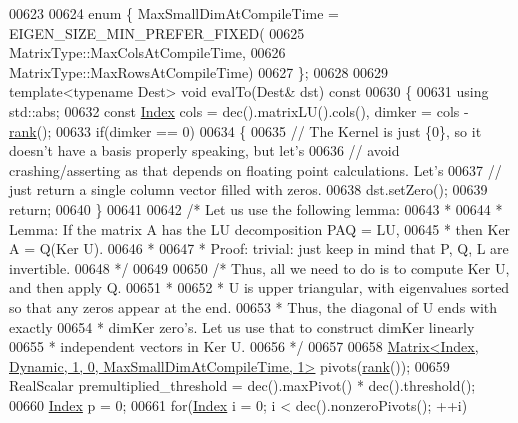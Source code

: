 \begin{DoxyCode}
00623 
00624   \textcolor{keyword}{enum} \{ MaxSmallDimAtCompileTime = EIGEN\_SIZE\_MIN\_PREFER\_FIXED(
00625             MatrixType::MaxColsAtCompileTime,
00626             MatrixType::MaxRowsAtCompileTime)
00627   \};
00628 
00629   \textcolor{keyword}{template}<\textcolor{keyword}{typename} Dest> \textcolor{keywordtype}{void} evalTo(Dest& dst)\textcolor{keyword}{ const}
00630 \textcolor{keyword}{  }\{
00631     \textcolor{keyword}{using} std::abs;
00632     \textcolor{keyword}{const} \hyperlink{namespace_eigen_a62e77e0933482dafde8fe197d9a2cfde}{Index} cols = dec().matrixLU().cols(), dimker = cols - \hyperlink{group___l_u___module_a67a870aa69e699e058d04802ba0bdad9}{rank}();
00633     \textcolor{keywordflow}{if}(dimker == 0)
00634     \{
00635       \textcolor{comment}{// The Kernel is just \{0\}, so it doesn't have a basis properly speaking, but let's}
00636       \textcolor{comment}{// avoid crashing/asserting as that depends on floating point calculations. Let's}
00637       \textcolor{comment}{// just return a single column vector filled with zeros.}
00638       dst.setZero();
00639       \textcolor{keywordflow}{return};
00640     \}
00641 
00642     \textcolor{comment}{/* Let us use the following lemma:}
00643 \textcolor{comment}{      *}
00644 \textcolor{comment}{      * Lemma: If the matrix A has the LU decomposition PAQ = LU,}
00645 \textcolor{comment}{      * then Ker A = Q(Ker U).}
00646 \textcolor{comment}{      *}
00647 \textcolor{comment}{      * Proof: trivial: just keep in mind that P, Q, L are invertible.}
00648 \textcolor{comment}{      */}
00649 
00650     \textcolor{comment}{/* Thus, all we need to do is to compute Ker U, and then apply Q.}
00651 \textcolor{comment}{      *}
00652 \textcolor{comment}{      * U is upper triangular, with eigenvalues sorted so that any zeros appear at the end.}
00653 \textcolor{comment}{      * Thus, the diagonal of U ends with exactly}
00654 \textcolor{comment}{      * dimKer zero's. Let us use that to construct dimKer linearly}
00655 \textcolor{comment}{      * independent vectors in Ker U.}
00656 \textcolor{comment}{      */}
00657 
00658     \hyperlink{group___core___module_class_eigen_1_1_matrix}{Matrix<Index, Dynamic, 1, 0, MaxSmallDimAtCompileTime, 1>}
       pivots(\hyperlink{group___l_u___module_a67a870aa69e699e058d04802ba0bdad9}{rank}());
00659     RealScalar premultiplied\_threshold = dec().maxPivot() * dec().threshold();
00660     \hyperlink{namespace_eigen_a62e77e0933482dafde8fe197d9a2cfde}{Index} p = 0;
00661     \textcolor{keywordflow}{for}(\hyperlink{namespace_eigen_a62e77e0933482dafde8fe197d9a2cfde}{Index} i = 0; i < dec().nonzeroPivots(); ++i)

\end{DoxyCode}
